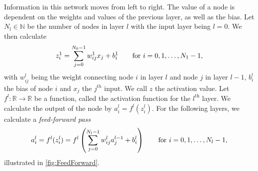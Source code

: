 \documentclass{article}
\theoremstyle{definition}
\begin{document}

Information in this network moves from left to right. The value of a node is dependent on the weights and values of the previous layer, as well as the bias. Let $N_l \in \mathbb{N}$ be the number of nodes in layer $l$ with the input layer being $l = 0$. We then calculate
\begin{equation*}
    z_{i}^1 = \sum_{j = 0}^{N_0 - 1} w_{ij}^1 x_j + b_i^1 \qquad \textnormal{for} \ i = 0, 1, \ldots, N_1 - 1,
\end{equation*}
with $w^l_{ij}$ being the weight connecting node $i$ in layer $l$ and node $j$ in layer $l-1$, $b_i^l$ the bias of node $i$ and $x_j$ the $j^{th}$ input. We call $z$ the activation value. Let $f^l: \mathbb{R} \to \mathbb{R}$ be a function, called the activation function for the $l^{\text{th}}$ layer. We calculate the output of the node by $a_i^l = f^l(z_i^l)$. For the following layers, we calculate a \textit{feed-forward pass}
\begin{equation*}
    a_i^l = f^l(z_{i}^l) = f^l \left( \sum_{j = 0}^{N_l - 1} w_{ij}^l a_j^{l-1} + b_i^{l} \right) \qquad \textnormal{for} \ i = 0, 1, \ldots, N_l - 1,
\end{equation*}
illustrated in \autoref{fig:FeedForward}.
\end{document}
